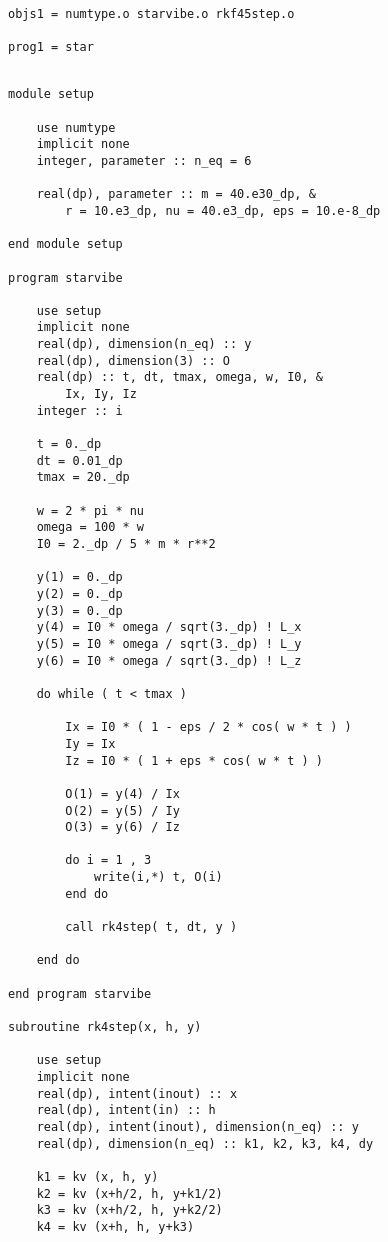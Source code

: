 \documentclass[12pt]{article}
\begin{document}
\begin{lstlisting}[frame=single,caption={Module {\tt numtype}},label=makefile2]

objs1 = numtype.o starvibe.o rkf45step.o

prog1 = star

\end{lstlisting}

\begin{lstlisting}[frame=single,caption={Module {\tt numtype}},label=starvibe]

module setup

    use numtype
    implicit none
    integer, parameter :: n_eq = 6

    real(dp), parameter :: m = 40.e30_dp, &
        r = 10.e3_dp, nu = 40.e3_dp, eps = 10.e-8_dp

end module setup

program starvibe

    use setup
    implicit none
    real(dp), dimension(n_eq) :: y
    real(dp), dimension(3) :: O
    real(dp) :: t, dt, tmax, omega, w, I0, &
        Ix, Iy, Iz
    integer :: i

    t = 0._dp
    dt = 0.01_dp
    tmax = 20._dp

    w = 2 * pi * nu
    omega = 100 * w
    I0 = 2._dp / 5 * m * r**2

    y(1) = 0._dp
    y(2) = 0._dp
    y(3) = 0._dp
    y(4) = I0 * omega / sqrt(3._dp) ! L_x
    y(5) = I0 * omega / sqrt(3._dp) ! L_y
    y(6) = I0 * omega / sqrt(3._dp) ! L_z

    do while ( t < tmax )

        Ix = I0 * ( 1 - eps / 2 * cos( w * t ) )
        Iy = Ix
        Iz = I0 * ( 1 + eps * cos( w * t ) )

        O(1) = y(4) / Ix 
        O(2) = y(5) / Iy 
        O(3) = y(6) / Iz

        do i = 1 , 3
            write(i,*) t, O(i)
        end do

        call rk4step( t, dt, y )

    end do

end program starvibe

subroutine rk4step(x, h, y)

    use setup
    implicit none
    real(dp), intent(inout) :: x
    real(dp), intent(in) :: h
    real(dp), intent(inout), dimension(n_eq) :: y
    real(dp), dimension(n_eq) :: k1, k2, k3, k4, dy

    k1 = kv (x, h, y)
    k2 = kv (x+h/2, h, y+k1/2)
    k3 = kv (x+h/2, h, y+k2/2)
    k4 = kv (x+h, h, y+k3)


\end{lstlisting}
\end{document}
